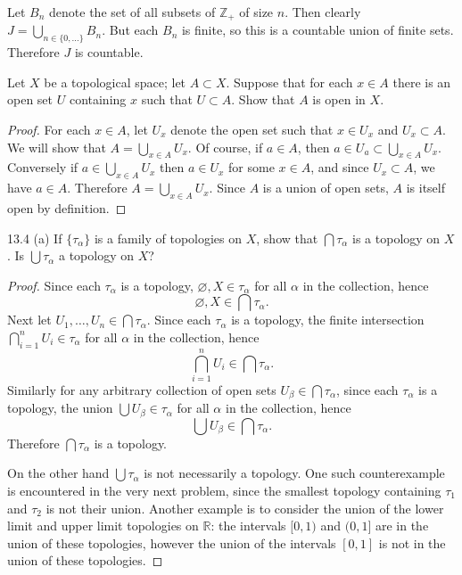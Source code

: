 \documentclass[11pt]{article}
\begin{document}
\begin{solution}
  Let $B_n$ denote the set of all subsets of $\mathbb{Z}_+$ of size $n$. Then
  clearly $J = \bigcup_{n \in \{0,\ldots\}} B_n$. But each $B_n$ is finite, so
  this is a countable union of finite sets. Therefore $J$ is countable.
\end{solution}

\begin{ex}{13.1}
  Let $X$ be a topological space; let $A \subset X$. Suppose that for each $x
  \in A$ there is an open set $U$ containing $x$ such that $U \subset A$. Show
  that $A$ is open in $X$.
\end{ex}

\begin{proof}
  For each $x \in A$, let $U_x$ denote the open set such that $x \in U_x$ and
  $U_x \subset A$. We will show that $A = \bigcup_{x \in A} U_x$. Of course, if
  $a \in A$, then $a \in U_a \subset \bigcup_{x \in A} U_x$. Conversely if $a \in
  \bigcup_{x \in A} U_x$ then $a \in U_x$ for some $x \in A$, and since $U_x
  \subset A$, we have $a \in A$. Therefore $A = \bigcup_{x \in A} U_x$. Since $A$
  is a union of open sets, $A$ is itself open by definition.
\end{proof}

\begin{ex}{13.4 (a)}
  If $\{ \tau_\alpha \}$ is a family of topologies on $X$, show that $\bigcap
  \tau_\alpha$ is a topology on $X$. Is $\bigcup \tau_\alpha$ a topology on $X$?
\end{ex}

\begin{proof}
  Since each $\tau_\alpha$ is a topology, $\varnothing, X \in \tau_\alpha$ for
  all $\alpha$ in the collection, hence
  \[\varnothing, X \in \bigcap \tau_\alpha.\]
  Next let $U_1,\ldots,U_n \in \bigcap \tau_\alpha$. Since each
  $\tau_\alpha$ is a topology, the finite intersection $\bigcap_{i = 1}^n U_i
  \in \tau_\alpha$ for all $\alpha$ in the collection, hence
  \[ \bigcap_{i = 1}^n U_i \in \bigcap \tau_\alpha. \]
  Similarly for any arbitrary collection of open sets $U_\beta \in \bigcap
  \tau_\alpha$, since each $\tau_\alpha$ is a topology, the union $\bigcup U_\beta \in
  \tau_\alpha$ for all $\alpha$ in the collection, hence
  \[ \bigcup U_\beta \in \bigcap \tau_\alpha. \]
  Therefore $\bigcap \tau_\alpha$ is a topology.

  On the other hand $\bigcup \tau_\alpha$ is not necessarily a topology. One
  such counterexample is encountered in the very next problem, since the
  smallest topology containing $\tau_1$ and $\tau_2$ is not their union. Another
  example is to consider the union of the lower limit and upper limit topologies
  on $\mathbb{R}$: the intervals $[0, 1)$ and $(0, 1]$ are in the union of these
  topologies, however the union of the intervals $[0, 1]$ is not in the union of
  these topologies.
\end{proof}
\end{document}
